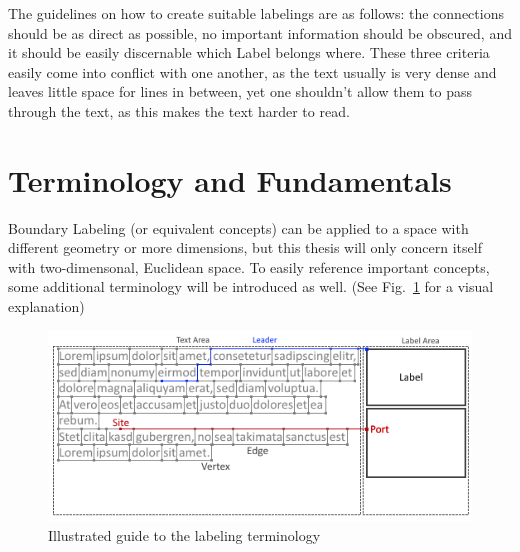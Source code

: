 \documentclass[11pt,a4paper]{vutinfth}
\begin{document}
The guidelines on how to create suitable labelings are as follows: the connections should be as direct as possible, no important information should be obscured, and it should be easily discernable which Label belongs where. These three criteria easily come into conflict with one another, as the text usually is very dense and leaves little space for lines in between, yet one shouldn't allow them to pass through the text, as this makes the text harder to read. 

\section{Terminology and Fundamentals} %
Boundary Labeling (or equivalent concepts) can be applied to a space with different geometry or more dimensions, but this thesis will only concern itself with two-dimensonal, Euclidean space.
To easily reference important concepts, some additional terminology will be introduced as well. (See Fig.~\ref{fig:term} for a visual explanation)


\begin{figure}%
 \captionsetup{justification=centering, margin=0.75cm}
 \centering
  \includegraphics[scale=0.90]{GraphTerminologyExtended.png}
  \caption{Illustrated guide to the labeling terminology}
 \label{fig:term}
\end{figure}
\end{document}
